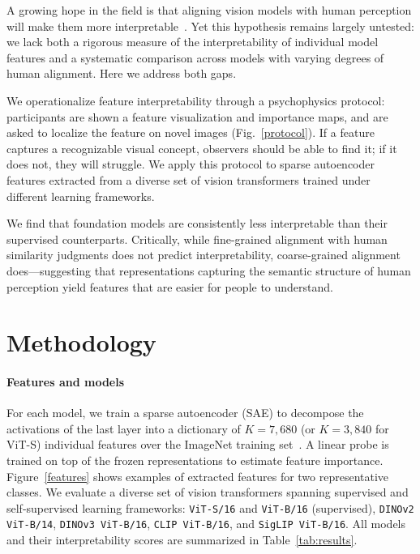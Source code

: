 \documentclass{ccn}
\begin{document}
A growing hope in the field is that aligning vision models with human perception will make them more interpretable~\citep{fel2022harmonizing, muttenthaler2025nature}. Yet this hypothesis remains largely untested: we lack both a rigorous measure of the interpretability of individual model features and a systematic comparison across models with varying degrees of human alignment. Here we address both gaps.

We operationalize feature interpretability through a psychophysics protocol: participants are shown a feature visualization and importance maps, and are asked to localize the feature on novel images (Fig.~\ref{protocol}). If a feature captures a recognizable visual concept, observers should be able to find it; if it does not, they will struggle. We apply this protocol to sparse autoencoder features extracted from a diverse set of vision transformers trained under different learning frameworks.

We find that foundation models are consistently less interpretable than their supervised counterparts. Critically, while fine-grained alignment with human similarity judgments does not predict interpretability, coarse-grained alignment does—suggesting that representations capturing the semantic structure of human perception yield features that are easier for people to understand.


\section{Methodology}

\paragraph{Features and models} For each model, we train a sparse autoencoder (SAE) to decompose the activations of the last layer into a dictionary of $K = 7{,}680$ (or $K = 3{,}840$ for ViT-S) individual features over the ImageNet training set~\citep{imagenet_cvpr09}. A linear probe is trained on top of the frozen representations to estimate feature importance. Figure~\ref{features} shows examples of extracted features for two representative classes. We evaluate a diverse set of vision transformers spanning supervised and self-supervised learning frameworks: \texttt{ViT-S/16} and \texttt{ViT-B/16} (supervised), \texttt{DINOv2 ViT-B/14}, \texttt{DINOv3 ViT-B/16}, \texttt{CLIP ViT-B/16}, and \texttt{SigLIP ViT-B/16}. All models and their interpretability scores are summarized in Table~\ref{tab:results}.
\end{document}
